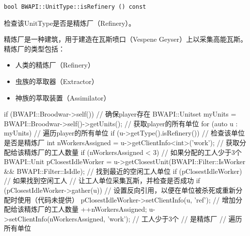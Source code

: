 \begin{tcolorbox}[colback=white, colframe=black!60!white, title=isRefinery(), arc=0mm]
    \begin{verbatim}
bool BWAPI::UnitType::isRefinery () const
    \end{verbatim}
    检查该UnitType是否是精炼厂（Refinery）。\par 精炼厂是一种建筑，用于建造在瓦斯喷口（Vespene Geyser）上以采集高能瓦斯。精炼厂的类型包括：
    \begin{itemize}
        \item 人类的精炼厂（Refinery）
        \item 虫族的萃取器（Extractor）
        \item 神族的萃取装置（Assimilator）
    \end{itemize}
\end{tcolorbox}
\begin{tcolorbox}[colback=white, colframe=black!60!white, title=isRefinery(), arc=0mm]
\begin{codebox}[示例代码]
if (BWAPI::Broodwar->self()) // 确保player存在
{
    BWAPI::Unitset myUnits = BWAPI::Broodwar->self()->getUnits(); // 获取player的所有单位
    for (auto u : myUnits) // 遍历player的所有单位
    {
        if (u->getType().isRefinery()) // 检查该单位是否是精炼厂
        {
            int nWorkersAssigned = u->getClientInfo<int>('work'); // 获取分配给该精炼厂的工人数量
            if (nWorkersAssigned < 3) // 如果分配的工人少于3个
            {
                BWAPI::Unit pClosestIdleWorker = u->getClosestUnit(BWAPI::Filter::IsWorker && BWAPI::Filter::IsIdle); // 找到最近的空闲工人单位
                if (pClosestIdleWorker) // 如果找到空闲工人
                {
                    // 让工人单位采集瓦斯，并检查是否成功
                    if (pClosestIdleWorker->gather(u))
                    {
                        // 设置反向引用，以便在单位被杀死或重新分配时使用（代码未提供）
                        pClosestIdleWorker->setClientInfo(u, 'ref');
                        // 增加分配给该精炼厂的工人数量
                        ++nWorkersAssigned;
                        u->setClientInfo(nWorkersAssigned, 'work');
                    }
                }
            } // 工人少于3个
        } // 是精炼厂
    } // 遍历所有单位
}

\end{codebox}
\end{tcolorbox}


